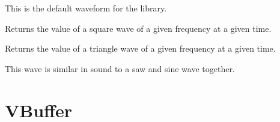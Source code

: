 \documentclass[letterpaper,10pt,english,openany,oneside]{sphinxmanual}
\begin{document}
\begin{fulllineitems}
\begin{fulllineitems}
\sphinxAtStartPar
This is the default waveform for the library.

\end{fulllineitems}



\begin{fulllineitems}

\pysigstartsignatures
{}
\pysigstopsignatures
\sphinxAtStartPar
Returns the value of a square wave of a given frequency at a given time.

\end{fulllineitems}



\begin{fulllineitems}

\pysigstartsignatures
{}
\pysigstopsignatures
\sphinxAtStartPar
Returns the value of a triangle wave of a given frequency at a given time.

\sphinxAtStartPar
This wave is similar in sound to a saw and sine wave together.

\end{fulllineitems}


\end{fulllineitems}



\section{VBuffer}
\label{\detokenize{dpav:vbuffer}}
\end{document}
